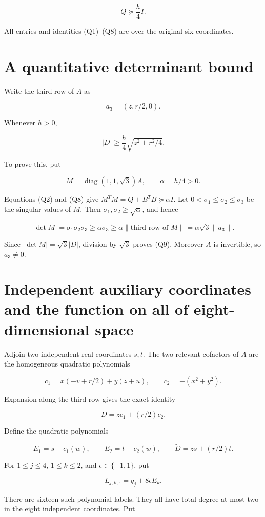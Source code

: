 \documentclass[11pt]{article}
\begin{document}
\[
Q\succeq\frac h4 I.
\tag{Q8}
\]

All entries and identities (Q1)--(Q8) are over the original six coordinates.

\section{A quantitative determinant bound}

Write the third row of \(A\) as

\[
a_3=(z,r/2,0).
\]

Whenever \(h>0\),

\[
\boxed{\quad |D|\ge \frac h4\sqrt{z^2+r^2/4}.\quad}
\tag{Q9}
\]

To prove this, put

\[
M=\operatorname{diag}(1,1,\sqrt3)A,
\qquad \alpha=h/4>0.
\]

Equations (Q2) and (Q8) give
\(M^TM=Q+B^TB\succeq\alpha I\).
Let \(0<\sigma_1\le\sigma_2\le\sigma_3\) be the singular values
of \(M\). Then \(\sigma_1,\sigma_2\ge\sqrt\alpha\), and hence

\[
|\det M|=\sigma_1\sigma_2\sigma_3
\ge\alpha\sigma_3
\ge\alpha\|\text{third row of }M\|
=\alpha\sqrt3\|a_3\|.
\]

Since \(|\det M|=\sqrt3|D|\), division by \(\sqrt3\) proves
(Q9). Moreover \(A\) is invertible, so \(a_3\ne0\).

\section{Independent auxiliary coordinates and the function on all of eight-dimensional space}

Adjoin two independent real coordinates \(s,t\). The two relevant
cofactors of \(A\) are the homogeneous quadratic polynomials

\[
c_1=x(-v+r/2)+y(z+u),\qquad
c_2=-(x^2+y^2).
\tag{Q10}
\]

Expansion along the third row gives the exact identity

\[
D=zc_1+(r/2)c_2.
\tag{Q11}
\]

Define the quadratic polynomials

\[
E_1=s-c_1(w),\qquad E_2=t-c_2(w),\qquad
\widetilde D=zs+(r/2)t.
\tag{Q12}
\]

For \(1\le j\le4\), \(1\le k\le2\), and
\(\epsilon\in\{-1,1\}\), put

\[
L_{j,k,\epsilon}=q_j+8\epsilon E_k.
\tag{Q13}
\]

There are sixteen such polynomial labels. They all have total degree at
most two in the eight independent coordinates. Put
\end{document}
